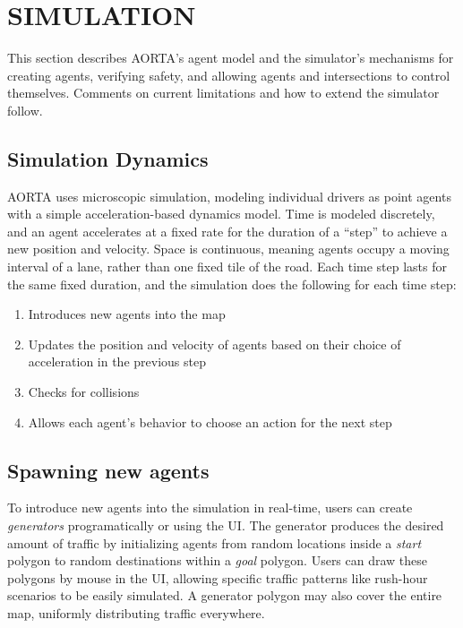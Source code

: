 \documentclass[letterpaper, 10 pt, conference]{ieeeconf}  %
\begin{document}

\section{SIMULATION}
\label{sec:simulation}

This section describes AORTA's agent model and the simulator's mechanisms for
creating agents, verifying safety, and allowing agents and intersections to
control themselves. Comments on current limitations and how to extend the
simulator follow.

\subsection{Simulation Dynamics} 

AORTA uses microscopic simulation, modeling individual drivers as point agents
with a simple acceleration-based dynamics model. Time is modeled discretely,
and an agent accelerates at a fixed rate for the duration of a ``step'' to
achieve a new position and velocity. Space is continuous, meaning agents occupy
a moving interval of a lane, rather than one fixed tile of the road. Each time
step lasts for the same fixed duration, and the simulation does the following
for each time step:

\begin{enumerate}
  \item Introduces new agents into the map
  \item Updates the position and velocity of agents based on their choice of
        acceleration in the previous step
  \item Checks for collisions
  \item Allows each agent's behavior to choose an action for the next step
\end{enumerate}

\subsection{Spawning new agents}

To introduce new agents into the simulation in real-time, users can create
\emph{generators} programatically or using the UI. The generator produces the
desired amount of traffic by initializing agents from random locations inside a
\textit{start} polygon to random destinations within a \textit{goal} polygon.
Users can draw these polygons by mouse in the UI, allowing specific traffic
patterns like rush-hour scenarios to be easily simulated. A generator polygon
may also cover the entire map, uniformly distributing traffic everywhere.
\end{document}
